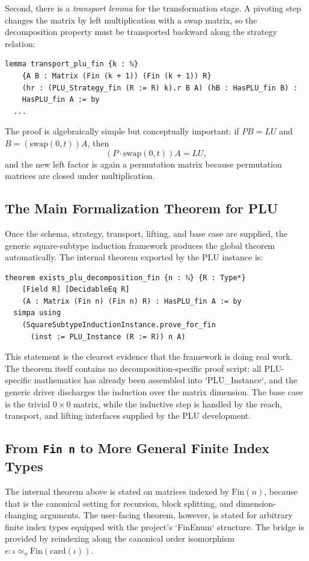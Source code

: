 \documentclass[pdflatex,sn-mathphys-num]{sn-jnl}%
\theoremstyle{thmstyleone}%
\theoremstyle{thmstyletwo}%
\theoremstyle{thmstylethree}%
\begin{document}
Second, there is a \emph{transport lemma} for the transformation stage.  A pivoting step changes the matrix by left multiplication with a swap matrix, so the decomposition property must be transported backward along the strategy relation:
\begin{lstlisting}
lemma transport_plu_fin {k : ℕ}
    {A B : Matrix (Fin (k + 1)) (Fin (k + 1)) R}
    (hr : (PLU_Strategy_fin (R := R) k).r B A) (hB : HasPLU_fin B) :
    HasPLU_fin A := by
  ...
\end{lstlisting}
The proof is algebraically simple but conceptually important: if \(P B = L U\) and \(B = (\mathrm{swap}(0,t))A\), then
\[
(P \cdot \mathrm{swap}(0,t))A = L U,
\]
and the new left factor is again a permutation matrix because permutation matrices are closed under multiplication.

\subsection{The Main Formalization Theorem for PLU}
Once the schema, strategy, transport, lifting, and base case are supplied, the generic square-subtype induction framework produces the global theorem automatically.  The internal theorem exported by the PLU instance is:

\begin{lstlisting}
theorem exists_plu_decomposition_fin {n : ℕ} {R : Type*}
    [Field R] [DecidableEq R]
    (A : Matrix (Fin n) (Fin n) R) : HasPLU_fin A := by
  simpa using
    (SquareSubtypeInductionInstance.prove_for_fin
      (inst := PLU_Instance (R := R)) n A)
\end{lstlisting}

This statement is the clearest evidence that the framework is doing real work.  The theorem itself contains no decomposition-specific proof script: all PLU-specific mathematics has already been assembled into `PLU_Instance`, and the generic driver discharges the induction over the matrix dimension.  The base case is the trivial \(0\times 0\) matrix, while the inductive step is handled by the reach, transport, and lifting interfaces supplied by the PLU development.

\subsection{From \texttt{Fin\ n} to More General Finite Index Types}
The internal theorem above is stated on matrices indexed by \(\mathrm{Fin}(n)\), because that is the canonical setting for recursion, block splitting, and dimension-changing arguments.  The user-facing theorem, however, is stated for arbitrary finite index types equipped with the project's `FinEnum` structure.  The bridge is provided by reindexing along the canonical order isomorphism \(e : \iota \simeq_o \mathrm{Fin}(\mathrm{card}(\iota))\).
\end{document}
